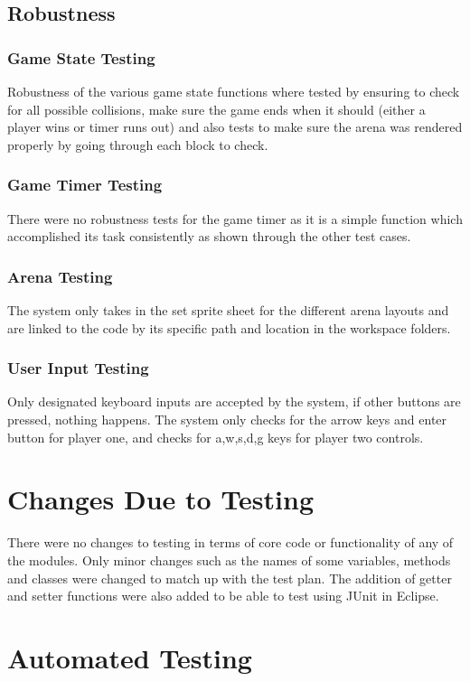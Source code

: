 \documentclass[12pt, letterpaper]{article}
\begin{document}
\subsection{Robustness}
\subsubsection{Game State Testing}
\indent \indent Robustness of the various game state functions where tested by ensuring to check for all possible collisions, make sure the game ends when it should (either a player wins or timer runs out) and also tests to make sure the arena was rendered properly by going through each block to check.
\subsubsection{Game Timer Testing}
\indent \indent There were no robustness tests for the game timer as it is a simple function which accomplished its task consistently as shown through the other test cases.
\subsubsection{Arena Testing}
\indent \indent The system only takes in the set sprite sheet for the different arena layouts and are linked to the code by its specific path and location in the workspace folders.
\subsubsection{User Input Testing}
\indent \indent Only designated keyboard inputs are accepted by the system, if other buttons are pressed, nothing happens. The system only checks for the arrow keys and enter button for player one, and checks for a,w,s,d,g keys for player two controls.

\section{Changes Due to Testing} 
\indent \indent There were no changes to testing in terms of core code or functionality of any of the modules. Only minor changes such as the names of some variables, methods and classes were changed to match up with the test plan. The addition of getter and setter functions were also added to be able to test using JUnit in Eclipse.

\section{Automated Testing} %
\end{document}
